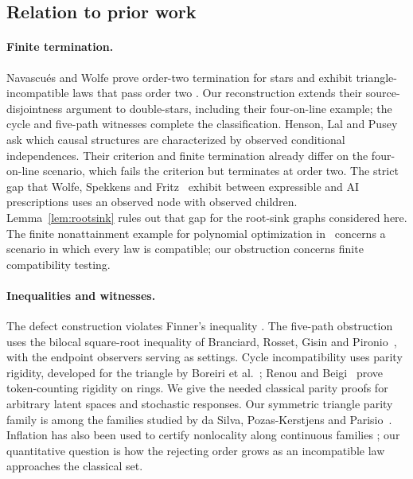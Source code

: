 \subsection{Relation to prior work}\label{sec:prior}

\paragraph{Finite termination.}
Navascués and Wolfe prove order-two termination for stars and exhibit triangle-incompatible laws that pass order two \cite[Section 4.1]{NW2020}. Our reconstruction extends their source-disjointness argument to double-stars, including their four-on-line example; the cycle and five-path witnesses complete the classification. Henson, Lal and Pusey~\cite{HensonLalPusey2014} ask which causal structures are characterized by observed conditional independences. Their criterion and finite termination already differ on the four-on-line scenario, which fails the criterion but terminates at order two. The strict gap that Wolfe, Spekkens and Fritz~\cite{WSF2019} exhibit between expressible and AI prescriptions uses an observed node with observed children. Lemma~\ref{lem:rootsink} rules out that gap for the root-sink graphs considered here. The finite nonattainment example for polynomial optimization in~\cite{NW2020} concerns a scenario in which every law is compatible; our obstruction concerns finite compatibility testing.

\paragraph{Inequalities and witnesses.}
The defect construction violates Finner's inequality \cite{Finner1992,Renou2019}. The five-path obstruction uses the bilocal square-root inequality of Branciard, Rosset, Gisin and Pironio~\cite{BranciardRossetGisinPironio2012}, with the endpoint observers serving as settings. Cycle incompatibility uses parity rigidity, developed for the triangle by Boreiri et al.\ \cite{BoreiriEtAl2023,BoreiriEtAl2025}; Renou and Beigi~\cite{RenouBeigi2022PRA} prove token-counting rigidity on rings. We give the needed classical parity proofs for arbitrary latent spaces and stochastic responses. Our symmetric triangle parity family is among the families studied by da Silva, Pozas-Kerstjens and Parisio~\cite{daSilvaPozasKerstjensParisio2025}. Inflation has also been used to certify nonlocality along continuous families \cite{PozasKerstjensGisinRenou2023}; our quantitative question is how the rejecting order grows as an incompatible law approaches the classical set.

